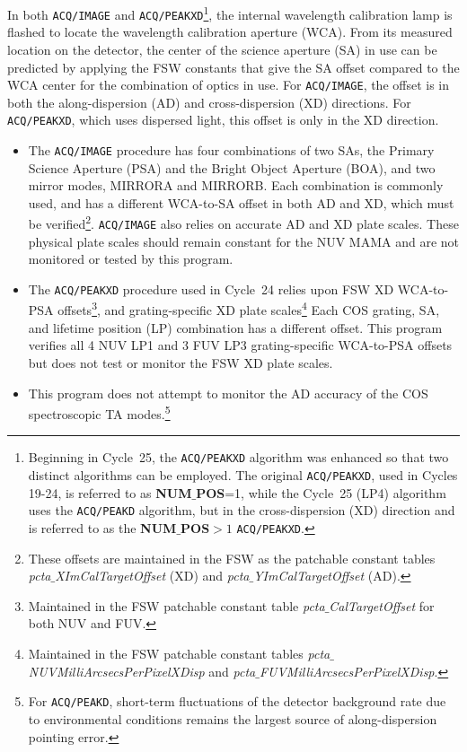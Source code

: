 \documentclass[12pt]{reportj}
\newcommand{\tacq}[1]{\texttt{ACQ/#1}}
\def\numpos{{\bf NUM$\_$POS}\rm}
\begin{document}
In both \tacq{IMAGE}  and \tacq{PEAKXD}\footnote{Beginning in Cycle~25, the \tacq{PEAKXD} algorithm was enhanced so that two distinct algorithms can be employed.
The original \tacq{PEAKXD}, used in Cycles 19-24, is referred to as \numpos=1, while the Cycle~25 (LP4) algorithm
uses the \tacq{PEAKD} algorithm, but in the cross-dispersion (XD) direction and is referred to as the \numpos $ > 1$ \tacq{PEAKXD}.},
 the internal wavelength calibration lamp is flashed to locate the wavelength calibration aperture (WCA). From its measured location on the detector, the center of the science aperture (SA) in use can be predicted by applying the FSW constants that give the SA offset compared to the WCA center for the combination of optics in use.
For \tacq{IMAGE}, the offset is in both the along-dispersion (AD) and cross-dispersion (XD) directions. For \tacq{PEAKXD}, which uses dispersed light, this offset is only in the XD direction.
\begin{itemize}
\item{
The \tacq{IMAGE} procedure has four combinations of two SAs, the Primary Science Aperture (PSA) and the Bright Object Aperture (BOA), and two mirror modes, MIRRORA and MIRRORB. Each combination is commonly used, and has a different WCA-to-SA offset in both AD and XD, which must be verified\footnote{These offsets are maintained in the FSW as the patchable constant tables {\it pcta$\_$XImCalTargetOffset} (XD) and {\it pcta$\_$YImCalTargetOffset} (AD).}. \tacq{IMAGE} also relies on accurate AD and XD plate scales. These physical plate scales should remain constant for the NUV MAMA and are not monitored or tested by this program.
}
\item{
The \tacq{PEAKXD} procedure used in Cycle~24 relies upon FSW XD WCA-to-PSA offsets\footnote{Maintained in the FSW patchable constant table {\it pcta$\_$CalTargetOffset} for both NUV and FUV.}, and grating-specific XD plate scales\footnote{Maintained in the FSW patchable constant tables {\it pcta$\_$NUVMilliArcsecsPerPixelXDisp} and {\it pcta$\_$FUVMilliArcsecsPerPixelXDisp}.}
Each COS grating, SA, and lifetime position (LP) combination has a different offset. This program verifies all 4 NUV LP1 and 3 FUV LP3 grating-specific WCA-to-PSA offsets but does not test or monitor the FSW XD plate scales.
}
\item{
This program does not attempt to monitor the AD accuracy of the COS spectroscopic TA modes.\footnote{For \tacq{PEAKD}, short-term fluctuations of the detector background rate due to environmental conditions remains the largest source of along-dispersion pointing error.}
}
\end{itemize}
\end{document}
